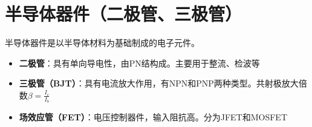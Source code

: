 
\section{半导体器件（二极管、三极管）}
\label{sec:semiconductor_devices}

半导体器件是以半导体材料为基础制成的电子元件。

\begin{itemize}
    \item \textbf{二极管}：具有单向导电性，由PN结构成。主要用于整流、检波等
    
    \item \textbf{三极管（BJT）}：具有电流放大作用，有NPN和PNP两种类型。共射极放大倍数$\beta = \frac{I_c}{I_b}$
    
    \item \textbf{场效应管（FET）}：电压控制器件，输入阻抗高。分为JFET和MOSFET
\end{itemize}
